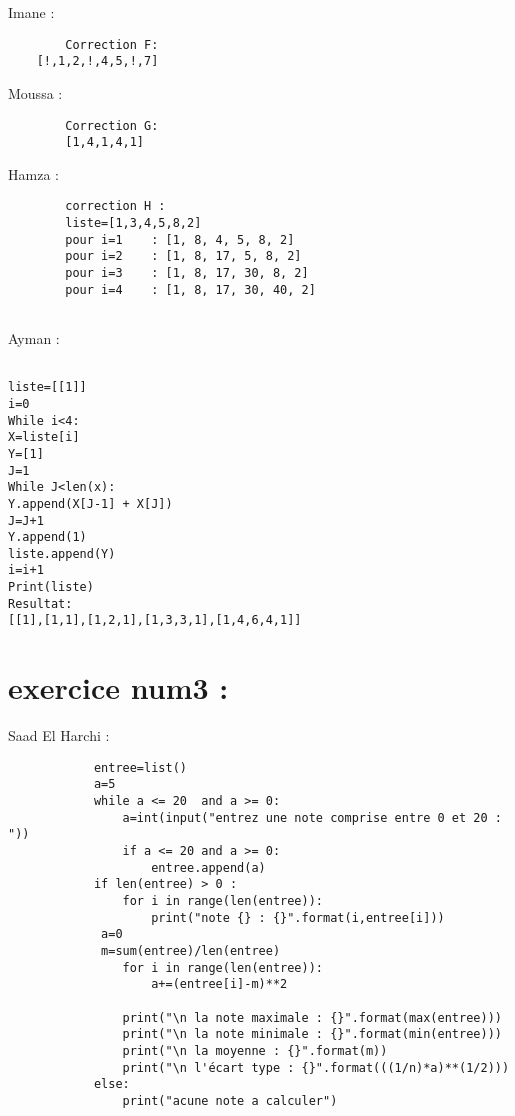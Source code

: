 \documentclass{article}
\begin{document}
	\begin{center}
    		Imane :
        \end{center} 
	
	\begin{lstlisting}
		Correction F:
	[!,1,2,!,4,5,!,7]

	\end{lstlisting}
	
    	\begin{center}
    		Moussa :
	\end{center} 
	
	\begin{lstlisting}
		Correction G:
		[1,4,1,4,1]
	\end{lstlisting}

    	\begin{center}
    		Hamza :
	\end{center} 
	\begin{lstlisting}
		correction H :
		liste=[1,3,4,5,8,2]
		pour i=1    : [1, 8, 4, 5, 8, 2]
		pour i=2    : [1, 8, 17, 5, 8, 2]
		pour i=3    : [1, 8, 17, 30, 8, 2]
		pour i=4    : [1, 8, 17, 30, 40, 2]
		
	\end{lstlisting}

	\begin{center}
    		Ayman :
	\end{center} 
	\begin{lstlisting}
	
liste=[[1]]
i=0
While i<4:
X=liste[i]
Y=[1]
J=1
While J<len(x):
Y.append(X[J-1] + X[J])
J=J+1
Y.append(1)
liste.append(Y)
i=i+1
Print(liste)
Resultat:
[[1],[1,1],[1,2,1],[1,3,3,1],[1,4,6,4,1]]
\end{lstlisting}
\section{exercice num3 :}
        \begin{center}
    		Saad El Harchi :
	\end{center}    	  
        	
    	\begin{lstlisting}
			entree=list()
			a=5
			while a <= 20  and a >= 0:
    			a=int(input("entrez une note comprise entre 0 et 20 : "))
    			if a <= 20 and a >= 0:
        			entree.append(a) 
			if len(entree) > 0 :
    			for i in range(len(entree)):
        			print("note {} : {}".format(i,entree[i]))
   			 a=0
   			 m=sum(entree)/len(entree)
    			for i in range(len(entree)):
        			a+=(entree[i]-m)**2
    
    			print("\n la note maximale : {}".format(max(entree)))
    			print("\n la note minimale : {}".format(min(entree)))
    			print("\n la moyenne : {}".format(m))
    			print("\n l'écart type : {}".format(((1/n)*a)**(1/2)))
			else:
    			print("acune note a calculer")
		\end{lstlisting}
\end{document}
